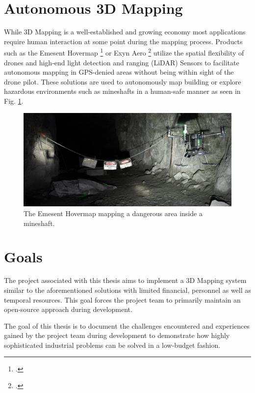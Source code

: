 \section{Autonomous 3D Mapping}
While 3D Mapping is a well-established and growing economy most applications require human interaction at some point during the mapping process. Products such as the Emesent Hovermap \footcite{hovermap2021} or Exyn Aero \footcite{exynAero2021} utilize the spatial flexibility of drones and high-end light detection and ranging (LiDAR) Sensors to facilitate autonomous mapping in GPS-denied areas without being within sight of the drone pilot. These solutions are used to autonomously map building or explore hazardous environments such as mineshafts in a human-safe manner as seen in Fig. \ref{fig:hovermap}.

\begin{figure}
	\centering
	\includegraphics[width=0.9\linewidth]{img/hovermap}
	\caption{
		The Emesent Hovermap mapping a dangerous area inside a mineshaft.\protect\footnotemark
	}
	\label{fig:hovermap}
\end{figure}

\section{Goals}
The project associated with this thesis aims to implement a 3D Mapping system similar to the aforementioned solutions with limited financial, personnel as well as temporal resources. This goal forces the project team to primarily maintain an open-source approach during development.

The goal of this thesis is to document the challenges encountered and experiences gained by the project team during development to demonstrate how highly sophisticated industrial problems can be solved in a low-budget fashion. 


